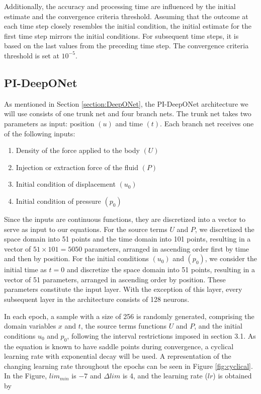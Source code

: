 \documentclass[sn-mathphys]{sn-jnl}%
\theoremstyle{thmstyleone}%
\theoremstyle{thmstyletwo}%
\theoremstyle{thmstylethree}%
\begin{document}
Additionally, the accuracy and processing time are influenced by the initial estimate and the convergence criteria threshold. Assuming that the outcome at each time step closely resembles the initial condition, the initial estimate for the first time step mirrors the initial conditions. For subsequent time steps, it is based on the last values from the preceding time step. The convergence criteria threshold is set at \(10^{-5}\).

\subsection{PI-DeepONet}
As mentioned in Section \ref{section:DeepONet}, the PI-DeepONet architecture we will use consists of one trunk net and four branch nets. The trunk net takes two parameters as input: position \(\left(u\right)\) and time \(\left(t\right)\). Each branch net receives one of the following inputs:

\begin{enumerate}
\item Density of the force applied to the body \((U)\)
\item Injection or extraction force of the fluid \((P)\)
\item Initial condition of displacement \((u_0)\)
\item Initial condition of pressure \((p_0)\)
\end{enumerate}

Since the inputs are continuous functions, they are discretized into a vector to serve as input to our equations. For the source terms \(U\) and \(P\), we discretized the space domain into 51 points and the time domain into 101 points, resulting in a vector of \(51 \times 101 = 5050\) parameters, arranged in ascending order first by time and then by position. For the initial conditions \((u_0)\) and \((p_0)\), we consider the initial time as \(t=0\) and discretize the space domain into 51 points, resulting in a vector of 51 parameters, arranged in ascending order by position. These parameters constitute the input layer. With the exception of this layer, every subsequent layer in the architecture consists of 128 neurons.

In each epoch, a sample with a size of 256 is randomly generated, comprising the domain variables \(x\) and \(t\), the source terms functions \(U\) and \(P\), and the initial conditions \(u_{0}\) and \(p_{0}\), following the interval restrictions imposed in section 3.1. As the equation is known to have saddle points during convergence, a cyclical learning rate \cite{li2020cyclical} with exponential decay will be used. A representation of the changing learning rate throughout the epochs can be seen in Figure \ref{fig:cyclical}. In the Figure, \(lim_{min}\) is \(-7\) and \(\Delta lim\) is 4, and the learning rate (\(lr\)) is obtained by
\end{document}
